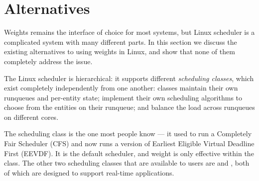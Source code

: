 \section{Alternatives}\label{s:alternatives}

Weights remains the \cgroups{} interface of choice for most systems, but Linux
scheduler is a complicated system with many different parts. In this section we
discuss the existing alternatives to using \cgroups{} weights in Linux, and show
that none of them completely address the issue. 

The Linux scheduler is hierarchical: it supports different \textit{scheduling
classes}, which exist completely independently from one another: classes
maintain their own runqueues and per-entity state; implement their own
scheduling algorithms to choose from the entities on their runqueue; and balance
the load across runqueues on different cores.

The \normalclass{} scheduling class is the one most people know --- it used to
run a Completely Fair Scheduler (CFS) and now runs a version of Earliest
Eligible Virtual Deadline First (EEVDF). It is the default scheduler, and
\cgroups{} weight is only effective within the \normalclass{} class. The other
two scheduling classes that are available to users are \deadlineclass{} and
\rtclass{}, both of which are designed to support real-time applications.

\subsection{\schedidle{}}

